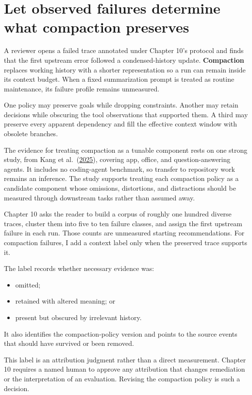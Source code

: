 \section{Let observed failures determine what compaction preserves}\label{let-observed-failures-determine-what-compaction-preserves}

A reviewer opens a failed trace annotated under Chapter 10's protocol and finds that the first upstream error followed a condensed-history update. \textbf{Compaction} replaces working history with a shorter representation so a run can remain inside its context budget. When a fixed summarization prompt is treated as routine maintenance, its failure profile remains unmeasured.

One policy may preserve goals while dropping constraints. Another may retain decisions while obscuring the tool observations that supported them. A third may preserve every apparent dependency and fill the effective context window with obsolete branches.

The evidence for treating compaction as a tunable component rests on one strong study, from Kang et al.~(\href{https://arxiv.org/abs/2510.00615}{2025}), covering app, office, and question-answering agents. It includes no coding-agent benchmark, so transfer to repository work remains an inference. The study supports treating each compaction policy as a candidate component whose omissions, distortions, and distractions should be measured through downstream tasks rather than assumed away.

Chapter 10 asks the reader to build a corpus of roughly one hundred diverse traces, cluster them into five to ten failure classes, and assign the first upstream failure in each run. Those counts are unmeasured starting recommendations. For compaction failures, I add a context label only when the preserved trace supports it.

The label records whether necessary evidence was:

\begin{itemize}
\tightlist
\item
  omitted;
\item
  retained with altered meaning; or
\item
  present but obscured by irrelevant history.
\end{itemize}

It also identifies the compaction-policy version and points to the source events that should have survived or been removed.

This label is an attribution judgment rather than a direct measurement. Chapter 10 requires a named human to approve any attribution that changes remediation or the interpretation of an evaluation. Revising the compaction policy is such a decision.

